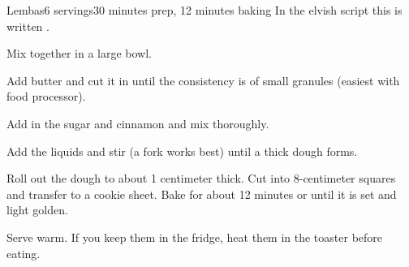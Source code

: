 \documentclass[../Cookbook.tex]{subfiles}
\begin{document}
\begin{recipe}{Lembas}{6 servings}{30 minutes prep, 12 minutes baking}
In the elvish script this is written
\tengwarannatar{\Tlambe \TTacute \Tumbar \TTthreedots \Tsilmenuquerna}.

Mix together in a large bowl.

Add butter and cut it in until the consistency is of small granules (easiest with food processor).

Add in the sugar and cinnamon and mix thoroughly.

Add the liquids and stir (a fork works best) until a thick dough forms.

Roll out the dough to about 1 centimeter thick. Cut into 8-centimeter squares and transfer to a cookie sheet. Bake for about 12 minutes or until it is set and light golden.

Serve warm. If you keep them in the fridge, heat them in the toaster before eating.

\end{recipe}
\end{document}
